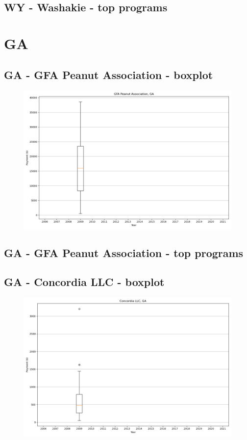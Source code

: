 \subsection*{WY - Washakie - top programs}

\newpage
\section*{GA}
\subsection*{GA - GFA Peanut Association - boxplot}
\begin{figure}[h]
\centering
\includegraphics[width=7in]{../output/boxplots/counties/GFA Peanut Association-GA_boxplot.png}
\end{figure}


\subsection*{GA - GFA Peanut Association - top programs}

\newpage
\subsection*{GA - Concordia LLC - boxplot}
\begin{figure}[h]
\centering
\includegraphics[width=7in]{../output/boxplots/counties/Concordia LLC-GA_boxplot.png}
\end{figure}


